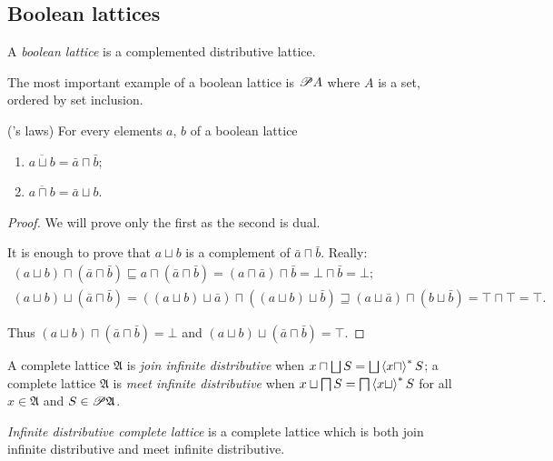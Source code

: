 \subsection{Boolean lattices}
\begin{defn}
A \emph{boolean lattice} is a complemented
distributive lattice.
\end{defn}
The most important example of a boolean lattice is $\mathscr{P} A$ where
\textbf{$A$} is a set, ordered by set inclusion.
\begin{thm}
('s laws) For every elements $a$,
$b$ of a boolean lattice
\begin{enumerate}
\item $\overline{a\sqcup b}=\bar{a}\sqcap\bar{b}$;
\item $\overline{a\sqcap b}=\bar{a}\sqcup b$.
\end{enumerate}
\end{thm}
\begin{proof}
We will prove only the first as the second is dual.

It is enough to prove that $a\sqcup b$ is a complement of $\bar{a}\sqcap\bar{b}$.
Really:
\begin{gather*}
(a\sqcup b)\sqcap(\bar{a}\sqcap\bar{b})\sqsubseteq a\sqcap(\bar{a}\sqcap\bar{b})=(a\sqcap\bar{a})\sqcap\bar{b}=\bot\sqcap\bar{b}=\bot;\\
(a\sqcup b)\sqcup(\bar{a}\sqcap\bar{b})=((a\sqcup b)\sqcup\bar{a})\sqcap((a\sqcup b)\sqcup\bar{b})\sqsupseteq(a\sqcup\bar{a})\sqcap(b\sqcup\bar{b})=\top\sqcap\top=\top.
\end{gather*}


Thus $(a\sqcup b)\sqcap(\bar{a}\sqcap\bar{b})=\bot$ and $(a\sqcup b)\sqcup(\bar{a}\sqcap\bar{b})=\top$.\end{proof}
\begin{defn}
A complete lattice $\mathfrak{A}$
is \emph{join infinite distributive} when $x\sqcap\bigsqcup S=\bigsqcup\rsupfun{x\sqcap}S$;
a complete lattice $\mathfrak{A}$
is \emph{meet infinite distributive} when $x\sqcup\bigsqcap S=\bigsqcap\left\langle x\sqcup\right\rangle ^{\ast}S$
for all $x\in\mathfrak{A}$ and $S\in\mathscr{P}\mathfrak{A}$.
\end{defn}

\begin{defn}
\emph{Infinite distributive complete
lattice} is a complete lattice which is both join infinite distributive
and meet infinite distributive.\end{defn}

